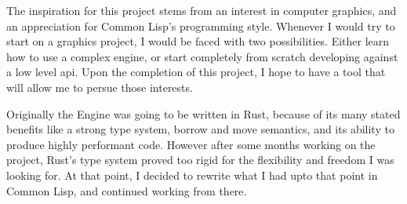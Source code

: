 
The inspiration for this project stems from an interest in computer graphics,
and an appreciation for Common Lisp's programming style.
Whenever I would try to start on a graphics project,
I would be faced with two possibilities.
Either learn how to use a complex engine,
or start completely from scratch developing against a low level \ac{api}.
Upon the completion of this project,
I hope to have a tool that will allow me to persue those interests.

Originally the Engine was going to be written in Rust,
because of its many stated benefits like a strong type system,
borrow and move semantics,
and its ability to produce highly performant code.
However after some months working on the project,
Rust's type system proved too rigid for the flexibility and freedom I was looking for.
At that point,
I decided to rewrite what I had upto that point in Common Lisp,
and continued working from there.
